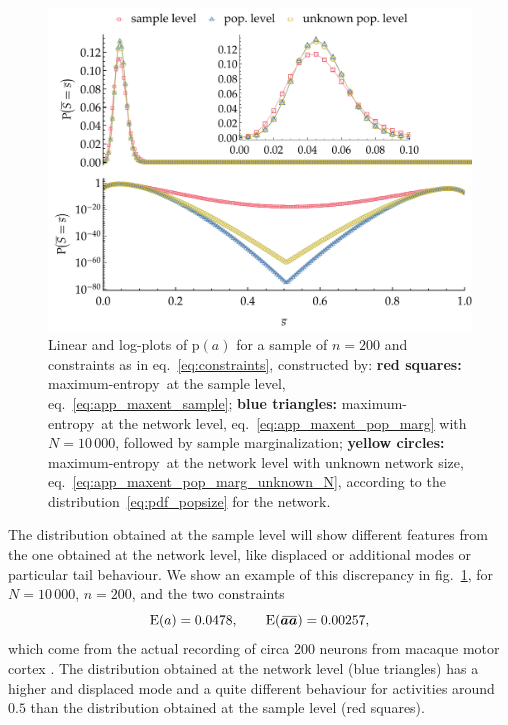 \documentclass[\ifafour a4paper,12pt,\else a5paper,10pt,\fi%
onecolumn,oneside,article,%
british%
]{memoir}
\theoremstyle{remark}
\theoremstyle{innote}
\newcommand*{\citep}{\parencites}
\newcommand*{\pf}{\mathrm{p}}%
\newcommand*{\E}{\mathrm{E}}
\renewcommand*{\|}{\nonscript\,\vert\nonscript\;\mathopen{}}
\newcommand*{\eqn}{eq.}%
\newcommand*{\fig}{fig.}%
\newcommand*{\widebar}[1]{{\mkern1.5mu\skew{2}\overline{\mkern-1.5mu#1\mkern-1.5mu}\mkern 1.5mu}}
\newcommand*{\sav}{\widebar} %
\newcommand*{\yav}{a}
\newcommand*{\yNv}{N}
\newcommand*{\yaa}{\bm{\yav}}%
\newcommand*{\yaas}{\sav{\yaa\yaa}}%
\newcommand*{\ya}{\yav}%
\newcommand*{\me}{maximum-entropy}
\begin{document}
\begin{figure}[!t]
\centering
\includegraphics[width=\linewidth]{comparison3.pdf}%
\caption{Linear and log-plots of $\pf(\ya)$ for a sample of $n=200$
  and constraints as in \eqn~\eqref{eq:constraints}, constructed by:
  \textcolor{myred}{\textbf{red squares:}} \me\ at the sample level,
  \eqn~\eqref{eq:app_maxent_sample};
  \textcolor{mypurpleblue}{\textbf{blue triangles:}} \me\ at the
  network level, \eqn~\eqref{eq:app_maxent_pop_marg} with
  $\yNv=10\,000$, followed by sample marginalization;
  \textcolor{myyellow}{\textbf{yellow circles:}} \me\ at the network
  level with unknown network size,
  \eqn~\eqref{eq:app_maxent_pop_marg_unknown_N}, according to the
  distribution~\eqref{eq:pdf_popsize} for the network.}
\label{fig:all_three}
\end{figure}%
The distribution obtained at the sample level will show different
features from the one obtained at the network level, like displaced or
additional modes or particular tail behaviour. We show an example of this
discrepancy in \fig~\ref{fig:all_three}, for
$\yNv=10\,000$, $n=200$, and the two constraints
\begin{equation}
  \label{eq:constraints}
  \E(\ya) = 0.0478,\qquad
  \E(\yaas) = 0.00257,
\end{equation}
which come from the actual recording of circa 200 neurons from macaque
motor cortex \citep{rostamietal2016_r2017}. The distribution obtained at the
network level (blue triangles) has a higher and displaced mode and a quite
different behaviour for activities around $0.5$ than the distribution
obtained at the sample level (red squares).
\end{document}

